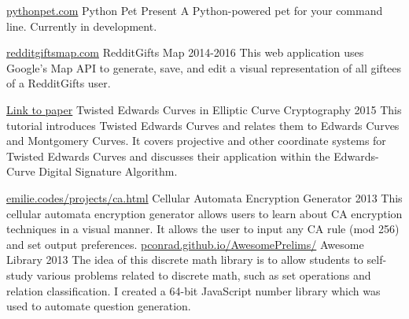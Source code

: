 \begin{cventries}
\cventry
     {\href{http://pythonpet.com}{pythonpet.com}}
    {Python Pet}
    {}
    {Present}
    {
         A Python-powered pet for your command line. Currently in development. 
    }

\cventry
     {\href{http://redditgiftsmap.com}{redditgiftsmap.com}}
    {RedditGifts Map}
    {}
    {2014-2016}
    {
         This web application uses Google's Map API to generate, save, and edit a visual representation of all giftees of a RedditGifts user. 
    }

\cventry
     {\href{https://www.semanticscholar.org/paper/Tutorial-of-Twisted-Edwards-Curves-in-Elliptic-Barnard/8eb88f622c8648aa40c2b60171da9d46c2414d5f}{Link to paper}}
    {Twisted Edwards Curves in Elliptic Curve Cryptography}
    {}
    {2015}
    {
         This tutorial introduces Twisted Edwards Curves and relates them to Edwards Curves and Montgomery Curves. It covers projective and other coordinate systems for Twisted Edwards Curves and discusses their application within the Edwards-Curve Digital Signature Algorithm.
    }

  \cventry
     {\href{http://emilie.codes/projects/ca.html}{emilie.codes/projects/ca.html}}
    {Cellular Automata Encryption Generator}
    {}
    {2013}
    {
         This cellular automata encryption generator allows users to learn about CA encryption techniques in a visual manner. It allows the user to input any CA rule (mod 256) and set output preferences.
    }
\cventry
     {\href{http://pconrad.github.io/AwesomePrelims/}{pconrad.github.io/AwesomePrelims/}}
    {Awesome Library}
    {}
    {2013}
    {
         The idea of this discrete math library is to allow students to self-study various problems related to discrete math, such as set operations and relation classification. I created a 64-bit JavaScript number library which was used to automate question generation.
    }


\end{cventries}